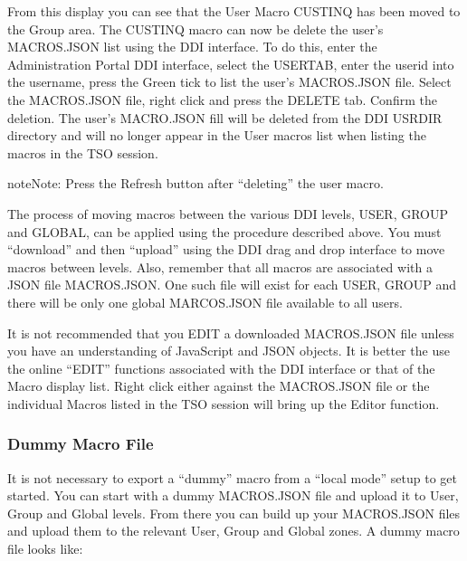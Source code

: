 \documentclass[letterpaper,10pt,english]{sphinxmanual}
\begin{document}
\sphinxAtStartPar
{}

\sphinxAtStartPar
{}

\sphinxAtStartPar
From this display you can see that the User Macro CUSTINQ has been moved to the Group area. The CUSTINQ macro can now be delete the user’s MACROS.JSON list using the DDI interface. To do this, enter the Administration Portal DDI interface, select the USERTAB, enter the userid into the username, press the Green tick to list the user’s MACROS.JSON file. Select the MACROS.JSON file, right click and press the DELETE tab. Confirm the deletion. The user’s MACRO.JSON fill will be deleted from the DDI USR\sphinxhyphen{}DIR directory and will no longer appear in the User macros list when listing the macros in the TSO session.

\begin{sphinxadmonition}{note}{Note:}
\sphinxAtStartPar
Press the Refresh button after “deleting” the user macro.
\end{sphinxadmonition}

\sphinxAtStartPar
{}

\sphinxAtStartPar
The process of moving macros between the various DDI levels, USER, GROUP and GLOBAL, can be applied using the procedure described above. You must “download” and then “upload” using the DDI drag and drop interface to move macros between levels. Also, remember that all macros are associated with a JSON file \textendash{} MACROS.JSON. One such file will exist for each USER,  GROUP and there will be only one global MARCOS.JSON file available to all users.

\sphinxAtStartPar
It is not recommended that you EDIT a downloaded MACROS.JSON file unless you have an understanding of JavaScript and JSON objects. It is better the use the online “EDIT” functions associated with the DDI interface or that of the Macro display list. Right click either against the MACROS.JSON file or the individual Macros listed in the TSO session will bring up the Editor function.


\subsubsection{Dummy Macro File}
\label{\detokenize{Customization:dummy-macro-file}}
\sphinxAtStartPar
It is not necessary to export a “dummy” macro from a “local mode” setup to get started. You can start with a dummy MACROS.JSON file and upload it to User, Group and Global levels. From there you can build up your MACROS.JSON files and upload them to the relevant User, Group and Global zones. A dummy macro file looks like:
\end{document}
